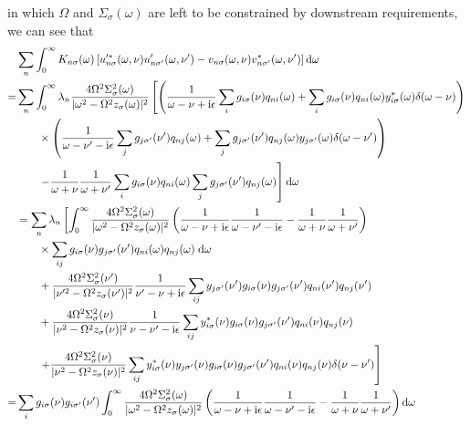 in which $\Omega$ and $\Sigma_\sigma(\omega)$ are left to be constrained by downstream requirements, we can see that
\begin{equation}
\begin{split}
&\sum_n\int_0^\infty K_{n\sigma}(\omega)\left[u_{n\sigma}^{\prime*}(\omega,\nu)u'_{n\sigma'}(\omega,\nu') - v_{n\sigma}(\omega,\nu)v_{n\sigma'}^*(\omega,\nu')\right]\mathrm{d}\omega\\
= &\sum_n\int_0^\infty\lambda_n\frac{4\Omega^2\Sigma_\sigma^2(\omega)}{|\omega^2 - \Omega^2z_\sigma(\omega)|^2}\left[\left(\frac{1}{\omega - \nu  + \mathrm{i}\epsilon}\sum_ig_{i\sigma}(\nu)q_{ni}(\omega) + \sum_ig_{i\sigma}(\nu)q_{ni}(\omega)y_{i\sigma}^*(\omega)\delta(\omega - \nu )\right)\right.\\
&\qquad \times \left(\frac{1}{\omega - \nu' - \mathrm{i}\epsilon}\sum_jg_{j\sigma'}(\nu')q_{nj}(\omega) + \sum_jg_{j\sigma'}(\nu')q_{nj}(\omega)y_{j\sigma'}(\omega)\delta(\omega - \nu')\right)\\
&\left.\qquad - \frac{1}{\omega + \nu }\frac{1}{\omega + \nu'}\sum_ig_{i\sigma}(\nu)q_{ni}(\omega)\sum_jg_{j\sigma'}(\nu')q_{nj}(\omega)\right]\mathrm{d}\omega\\
&= \sum_n\lambda_n\left[\int_0^\infty\frac{4\Omega^2\Sigma_\sigma^2(\omega)}{|\omega^2 - \Omega^2z_\sigma(\omega)|^2}\left(\frac{1}{\omega - \nu  + \mathrm{i}\epsilon}\frac{1}{\omega - \nu' - \mathrm{i}\epsilon} - \frac{1}{\omega + \nu }\frac{1}{\omega + \nu'}\right)\right.\\
&\qquad\times\sum_{ij}g_{i\sigma}(\nu)g_{j\sigma'}(\nu')q_{ni}(\omega)q_{nj}(\omega)\;\mathrm{d}\omega\\
&\qquad + \frac{4\Omega^2\Sigma_\sigma^2(\nu')}{|\nu^{\prime2} - \Omega^2z_\sigma(\nu')|^2}\frac{1}{\nu' - \nu  + \mathrm{i}\epsilon}\sum_{ij}y_{j\sigma'}(\nu')g_{i\sigma}(\nu)g_{j\sigma'}(\nu')q_{ni}(\nu')q_{nj}(\nu')\\
&\qquad + \frac{4\Omega^2\Sigma_\sigma^2(\nu )}{|\nu ^2 - \Omega^2z_\sigma(\nu )|^2}\frac{1}{\nu  - \nu' - \mathrm{i}\epsilon}\sum_{ij}y_{i\sigma}^*(\nu )g_{i\sigma}(\nu)g_{j\sigma'}(\nu')q_{ni}(\nu)q_{nj}(\nu )\\
&\qquad\left. + \frac{4\Omega^2\Sigma_\sigma^2(\nu )}{|\nu^2 - \Omega^2z_\sigma(\nu )|^2}\sum_{ij}y^*_{i\sigma}(\nu )y_{j\sigma'}(\nu )g_{i\sigma}(\nu)g_{j\sigma'}(\nu')q_{ni}(\nu )q_{nj}(\nu )\delta(\nu  - \nu') \vphantom{\int_0^\infty} \right]\\
= &\sum_ig_{i\sigma}(\nu)g_{i\sigma'}(\nu')\int_0^\infty\frac{4\Omega^2\Sigma_\sigma^2(\omega)}{|\omega^2 - \Omega^2z_\sigma(\omega)|^2}\left(\frac{1}{\omega - \nu  + \mathrm{i}\epsilon}\frac{1}{\omega - \nu' - \mathrm{i}\epsilon} - \frac{1}{\omega + \nu }\frac{1}{\omega + \nu'}\right)\mathrm{d}\omega\\

\end{split}
\end{equation}
